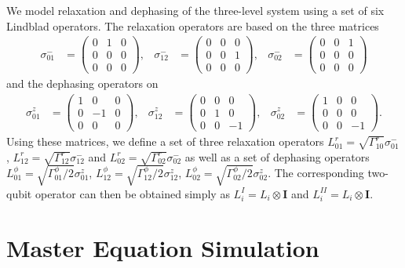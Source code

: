 We model relaxation and dephasing of the three-level system using a set of six Lindblad operators. The relaxation operators are based on the three matrices
%
\begin{align}
\sigma^-_{01} & =  \left( \begin{array}{ccc} 0 & 1 & 0 \\ 0 & 0 & 0 \\ 0 & 0 & 0 \end{array} \right), & 
\sigma^-_{12} & =  \left( \begin{array}{ccc} 0 & 0 & 0 \\ 0 & 0 & 1 \\ 0 & 0 & 0 \end{array} \right), &
\sigma^-_{02} & =  \left( \begin{array}{ccc} 0 & 0 & 1 \\ 0 & 0 & 0 \\ 0 & 0 & 0 \end{array} \right)
\end{align}
%
and the dephasing operators on
%
\begin{align}
\sigma^z_{01} & =  \left( \begin{array}{ccc} 1 & 0 & 0 \\ 0 &-1 & 0 \\ 0 & 0 & 0 \end{array} \right), &
\sigma^z_{12} & =  \left( \begin{array}{ccc} 0 & 0 & 0 \\ 0 & 1 & 0 \\ 0 & 0 &-1 \end{array} \right), &
\sigma^z_{02} & =  \left( \begin{array}{ccc} 1 & 0 & 0 \\ 0 & 0 & 0 \\ 0 & 0 &-1 \end{array} \right).  
\end{align}
%
Using these matrices, we define a set of three relaxation operators $L^r_{01} = \sqrt{\Gamma^r_{10}}\sigma^-_{01}$, $L^r_{12} = \sqrt{\Gamma^r_{12}}\sigma^-_{12}$ and $L^r_{02}=\sqrt{\Gamma^r_{02}}\sigma^-_{02}$ as well as a set of dephasing operators $L^\phi_{01} = \sqrt{\Gamma^\phi_{01}/2}\sigma^z_{01}$, $L^\phi_{12} = \sqrt{\Gamma^\phi_{12}/2}\sigma^z_{12}$, $L^\phi_{02}=\sqrt{\Gamma^\phi_{02}/2}\sigma^z_{02}$. The corresponding two-qubit operator can then be obtained simply as $L^I_i = L_i\otimes {\mathbf I}$ and $L^{II}_i = L_i\otimes {\mathbf I}$.

\section{Master Equation Simulation}


